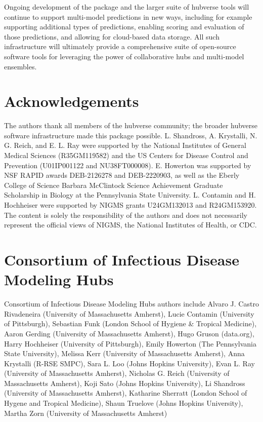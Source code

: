 \documentclass[
  article,
  shortnames,
  notitle]{jss}
\begin{document}
Ongoing development of the  package and the larger
suite of hubverse tools will continue to support multi-model predictions
in new ways, including for example supporting additional types of
predictions, enabling scoring and evaluation of those predictions, and
allowing for cloud-based data storage. All such infrastructure will
ultimately provide a comprehensive suite of open-source software tools
for leveraging the power of collaborative hubs and multi-model
ensembles.

\section*{Acknowledgements}\label{acknowledgements}

The authors thank all members of the hubverse community; the broader
hubverse software infrastructure made this package possible. L.
Shandross, A. Krystalli, N. G. Reich, and E. L. Ray were supported by
the National Institutes of General Medical Sciences (R35GM119582) and
the US Centers for Disease Control and Prevention (U01IP001122 and
NU38FT000008). E. Howerton was supported by NSF RAPID awards DEB-2126278
and DEB-2220903, as well as the Eberly College of Science Barbara
McClintock Science Achievement Graduate Scholarship in Biology at the
Pennsylvania State University. L. Contamin and H. Hochheiser were
supported by NIGMS grants U24GM132013 and R24GM153920. The content is solely the
responsibility of the authors and does not necessarily represent the
official views of NIGMS, the National Institutes of Health, or CDC.

\section*{Consortium of Infectious Disease Modeling
Hubs}\label{consortium-of-infectious-disease-modeling-hubs}

Consortium of Infectious Disease Modeling Hubs authors include Alvaro J.
Castro Rivadeneira (University of Massachusetts Amherst), Lucie Contamin
(University of Pittsburgh), Sebastian Funk (London School of Hygiene \&
Tropical Medicine), Aaron Gerding (University of Massachusetts Amherst),
Hugo Gruson (data.org), Harry Hochheiser (University of Pittsburgh),
Emily Howerton (The Pennsylvania State University), Melissa Kerr
(University of Massachusetts Amherst), Anna Krystalli (R-RSE SMPC), Sara
L. Loo (Johns Hopkins University), Evan L. Ray (University of
Massachusetts Amherst), Nicholas G. Reich (University of Massachusetts
Amherst), Koji Sato (Johns Hopkins University), Li Shandross (University
of Massachusetts Amherst), Katharine Sherratt (London School of Hygene
and Tropical Medicine), Shaun Truelove (Johns Hopkins University),
Martha Zorn (University of Massachusetts Amherst)


\renewcommand\refname{References}
  
\end{document}
